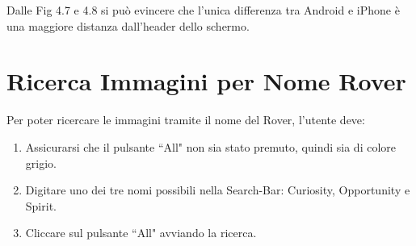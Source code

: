 Dalle Fig 4.7 e 4.8 si pu\`o evincere che l'unica differenza tra Android e iPhone \`e una maggiore distanza dall'header dello schermo.
\section{Ricerca Immagini per Nome Rover}
Per poter ricercare le immagini tramite il nome del Rover, l'utente deve:

\begin{enumerate}
    \item Assicurarsi che il pulsante ``All" non sia stato premuto, quindi sia di colore grigio.
    \item Digitare uno dei tre nomi possibili nella Search-Bar: Curiosity, Opportunity e Spirit.
    \item Cliccare sul pulsante ``All" avviando la ricerca.
\end{enumerate}


